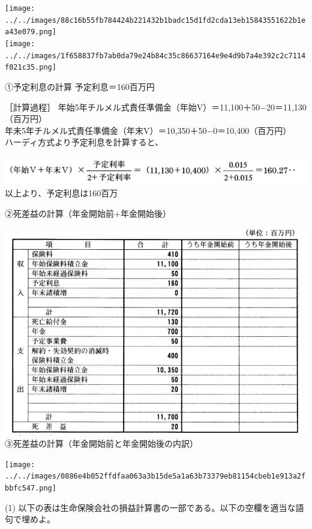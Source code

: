 \documentclass[report,gutter=10mm,fore-edge=10mm,uplatex,dvipdfmx]{jlreq}
\begin{document}
\texttt{[image: ../../images/88c16b55fb784424b221432b1badc15d1fd2cda13eb15843551622b1ea43e079.png]}\\
\texttt{[image: ../../images/1f658837fb7ab0da79e24b84c35c86637164e9e4d9b7a4e392c2c7114f021c35.png]}


①予定利息の計算 予定利息＝160百万円 

［計算過程］
年始5年チルメル式責任準備金（年始V）＝11,100＋50−20＝11,130（百万円）\\
年未5年チルメル式責任準備金（年末V）＝10,350＋50−0＝10,400（百万円）\\
ハーディ方式より予定利息を計算すると、

\includegraphics[scale=0.8]{./images/ProbH15-2-2-3-Hardy.png}\\

以上より、予定利息は160百万

②死差益の計算（年金開始前+年金開始後）

\includegraphics[scale=0.8]{./images/ProbH15-2-2-3-Shisaeki.png}\\

③死差益の計算（年金開始前と年金開始後の内訳）

\texttt{[image: ../../images/0886e4b052ffdfaa063a3b15de5a1a63b73379eb81154cbeb1e913a2fbbfc547.png]}


(1) 以下の表は生命保険会社の損益計算書の一部である。以下の空欄を適当な語句で埋めよ。
\end{document}
